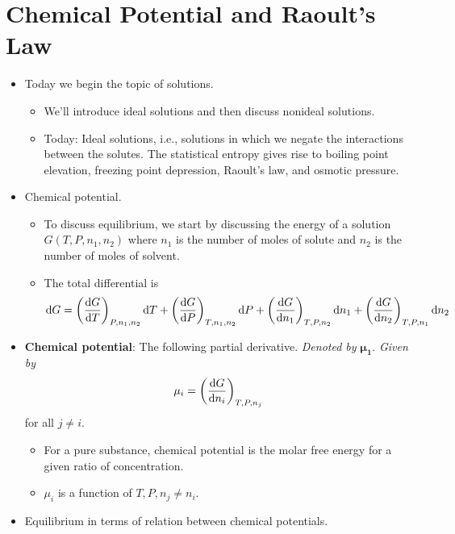 \documentclass[../notes.tex]{subfiles}
\begin{document}
\section{Chemical Potential and Raoult's Law}
\begin{itemize}
    \item {}Today we begin the topic of solutions.
    \begin{itemize}
        \item We'll introduce ideal solutions and then discuss nonideal solutions.
        \item Today: Ideal solutions, i.e., solutions in which we negate the interactions between the solutes. The statistical entropy gives rise to boiling point elevation, freezing point depression, Raoult's law, and osmotic pressure.
    \end{itemize}
    \item Chemical potential.
    \begin{itemize}
        \item To discuss equilibrium, we start by discussing the energy of a solution $G(T,P,n_1,n_2)$ where $n_1$ is the number of moles of solute and $n_2$ is the number of moles of solvent.
        \item The total differential is
        \begin{equation*}
            \dd{G} = \left( \dv{G}{T} \right)_{P,n_1,n_2}\dd{T}+\left( \dv{G}{P} \right)_{T,n_1,n_2}\dd{P}+\left( \dv{G}{n_1} \right)_{T,P,n_2}\dd{n_1}+\left( \dv{G}{n_2} \right)_{T,P,n_1}\dd{n_2}
        \end{equation*}
    \end{itemize}
    \item \textbf{Chemical potential}: The following partial derivative. \emph{Denoted by} $\bm{\mu_1}$. \emph{Given by}
    \begin{equation*}
        \mu_i = \left( \dv{G}{n_i} \right)_{T,P,n_j}
    \end{equation*}
    for all $j\neq i$.
    \begin{itemize}
        \item For a pure substance, chemical potential is the molar free energy for a given ratio of concentration.
        \item $\mu_i$ is a function of $T,P,n_j\neq n_i$.
    \end{itemize}
    \item Equilibrium in terms of relation between chemical potentials.
    \begin{itemize}

\end{itemize}
\end{itemize}
\end{document}
